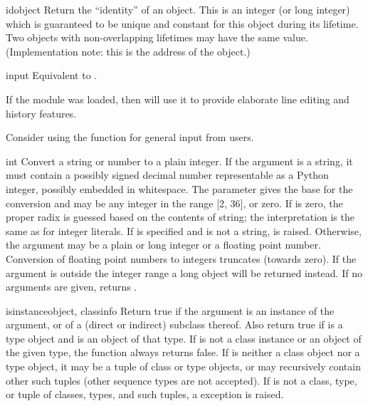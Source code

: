 \begin{funcdesc}{id}{object}
  Return the ``identity'' of an object.  This is an integer (or long
  integer) which is guaranteed to be unique and constant for this
  object during its lifetime.  Two objects with non-overlapping lifetimes
  may have the same  value.  (Implementation
  note: this is the address of the object.)
\end{funcdesc}

\begin{funcdesc}{input}{}
  Equivalent to .

  If the  module was loaded, then
   will use it to provide elaborate line editing and
  history features.

  Consider using the  function for general input
  from users.
\end{funcdesc}

\begin{funcdesc}{int}{}
  Convert a string or number to a plain integer.  If the argument is a
  string, it must contain a possibly signed decimal number
  representable as a Python integer, possibly embedded in whitespace.
  The  parameter gives the base for the
  conversion and may be any integer in the range [2, 36], or zero.  If
   is zero, the proper radix is guessed based on the
  contents of string; the interpretation is the same as for integer
  literals.  If  is specified and  is not a string,
   is raised.
  Otherwise, the argument may be a plain or
  long integer or a floating point number.  Conversion of floating
  point numbers to integers truncates (towards zero).
  If the argument is outside the integer range a long object will
  be returned instead.  If no arguments are given, returns .
\end{funcdesc}

\begin{funcdesc}{isinstance}{object, classinfo}
  Return true if the  argument is an instance of the
   argument, or of a (direct or indirect) subclass
  thereof.  Also return true if  is a type object and
   is an object of that type.  If  is not a
  class instance or an object of the given type, the function always
  returns false.  If  is neither a class object nor a
  type object, it may be a tuple of class or type objects, or may
  recursively contain other such tuples (other sequence types are not
  accepted).  If  is not a class, type, or tuple of
  classes, types, and such tuples, a  exception
  is raised.
\end{funcdesc}

